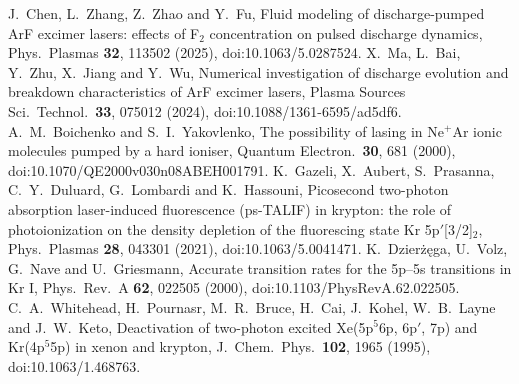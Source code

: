  J.~Chen, L.~Zhang, Z.~Zhao and Y.~Fu, Fluid modeling of discharge-pumped ArF excimer lasers: effects of F$_2$ concentration on pulsed discharge dynamics, Phys.\ Plasmas \textbf{32}, 113502 (2025), doi:10.1063/5.0287524.
 X.~Ma, L.~Bai, Y.~Zhu, X.~Jiang and Y.~Wu, Numerical investigation of discharge evolution and breakdown characteristics of ArF excimer lasers, Plasma Sources Sci.\ Technol.\ \textbf{33}, 075012 (2024), doi:10.1088/1361-6595/ad5df6.
 A.~M.~Boichenko and S.~I.~Yakovlenko, The possibility of lasing in Ne$^+$Ar ionic molecules pumped by a hard ioniser, Quantum Electron.\ \textbf{30}, 681 (2000), doi:10.1070/QE2000v030n08ABEH001791.
 K.~Gazeli, X.~Aubert, S.~Prasanna, C.~Y.~Duluard, G.~Lombardi and K.~Hassouni, Picosecond two-photon absorption laser-induced fluorescence (ps-TALIF) in krypton: the role of photoionization on the density depletion of the fluorescing state Kr 5p$'$[3/2]$_2$, Phys.\ Plasmas \textbf{28}, 043301 (2021), doi:10.1063/5.0041471.
 K.~Dzier\.{z}\k{e}ga, U.~Volz, G.~Nave and U.~Griesmann, Accurate transition rates for the 5p--5s transitions in Kr I, Phys.\ Rev.\ A \textbf{62}, 022505 (2000), doi:10.1103/PhysRevA.62.022505.
 C.~A.~Whitehead, H.~Pournasr, M.~R.~Bruce, H.~Cai, J.~Kohel, W.~B.~Layne and J.~W.~Keto, Deactivation of two-photon excited Xe(5p$^5$6p, 6p$'$, 7p) and Kr(4p$^5$5p) in xenon and krypton, J.~Chem.\ Phys.\ \textbf{102}, 1965 (1995), doi:10.1063/1.468763.
